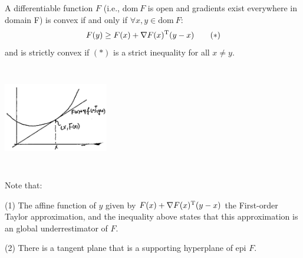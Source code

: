 \begin{theorem}
	A differentiable function $F$ (i.e., $\text{dom}\ F$ is open and gradients exist everywhere in domain F) is convex if and only if $\forall x,y\in \text{dom}\ F$:
	\begin{equation*}
	F(y)\geq F(x) + \nabla F(x)^{{\rm T}}(y-x) \qquad (*)
	\end{equation*}
	and is strictly convex if $(*)$ is a strict inequality for all $x\neq y$.
\end{theorem}
	\begin{marginfigure}
	\centering
	\includegraphics[width=1.8in,height=1.8in]{figures/ch08/figure1106_1.png}
	\end{marginfigure}
	Note that:
	
	(1) The affine function of $y$ given by $F(x) + \nabla F(x)^{{\rm T}}(y-x)$ the First-order Taylor approximation, and the inequality above states that this approximation is an global underrestimator of $F$.
	
	(2) There is a tangent plane that is a supporting hyperplane of epi $F$.

